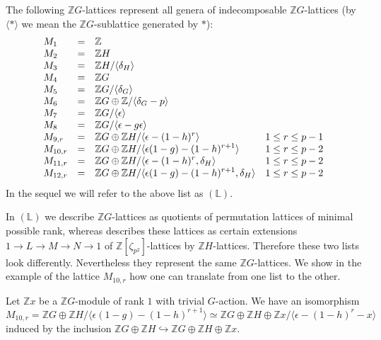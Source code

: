 \documentclass[11pt]{amsart}
\theoremstyle{definition}
\theoremstyle{remark}
\begin{document}
The following ${\mathbb{Z}} G$-lattices represent all genera of indecomposable ${\mathbb{Z}} G$-lattices
(by $\langle * \rangle$ we mean the ${\mathbb{Z}} G$-sublattice generated by $*$):
\[
\everymath{\displaystyle}
\begin{array}{lcll}
M_1&=&{\mathbb{Z}}&\\
M_2&=&{\mathbb{Z}} H&\\ 
M_3&=&{\mathbb{Z}} H/\langle\delta_H\rangle\\ 
M_4&=&{\mathbb{Z}} G\\%
M_5&=&{\mathbb{Z}} G /\langle\delta_G\rangle\\ 
M_6&=&{\mathbb{Z}} G\oplus {\mathbb{Z}} / \langle\delta_G-p\rangle&\\%
M_7&=&{\mathbb{Z}} G/\langle\epsilon\rangle\\ 
M_8&=&{\mathbb{Z}} G/\langle\epsilon-g\epsilon\rangle&\\%
M_{9,r}&=&{\mathbb{Z}} G\oplus {\mathbb{Z}} H /\langle\epsilon-(1-h)^r\rangle&1\le r\le p-1\\%
M_{10,r}&=&{\mathbb{Z}} G\oplus {\mathbb{Z}} H /\langle\epsilon(1-g)-(1-h)^{r+1}\rangle&1\le r\le p-2\\%
M_{11,r}&=&{\mathbb{Z}} G\oplus {\mathbb{Z}} H /\langle\epsilon-(1-h)^r,\delta_H\rangle&1\le r\le p-2\\%
M_{12,r}&=&{\mathbb{Z}} G\oplus {\mathbb{Z}} H / \langle\epsilon(1-g)-(1-h)^{r+1},\delta_H\rangle&1\le r\le p-2\\%
\end{array}
\]
In the sequel we will refer to the above list as ${(\mathbb{L})}$. \par
In ${(\mathbb{L})}$ we describe ${\mathbb{Z}} G$-lattices as quotients of permutation lattices of minimal possible rank, whereas \cite[34.32]{CR} describes these lattices as certain extensions $1 \to L \to M \to N \to 1$ of ${\mathbb{Z}}[\zeta_{p^2}]$-lattices by ${\mathbb{Z}} H$-lattices. 
Therefore these two lists look differently. Nevertheless they represent the same ${\mathbb{Z}} G$-lattices.
We show in the example of the lattice $M_{10,r}$ how one can translate from one list to the other.

Let ${\mathbb{Z}} x$ be a ${\mathbb{Z}} G$-module of rank $1$ with trivial $G$-action. We have an isomorphism
\[M_{10,r}={\mathbb{Z}} G \oplus {\mathbb{Z}} H/\langle \epsilon (1-g) - (1-h)^{r+1} \rangle \simeq {\mathbb{Z}} G\oplus {\mathbb{Z}} H \oplus {\mathbb{Z}} x /\langle \epsilon-(1-h)^r-x\rangle
\] induced by the inclusion ${\mathbb{Z}} G \oplus {\mathbb{Z}} H \hookrightarrow {\mathbb{Z}} G \oplus {\mathbb{Z}} H \oplus {\mathbb{Z}} x$.
\end{document}
